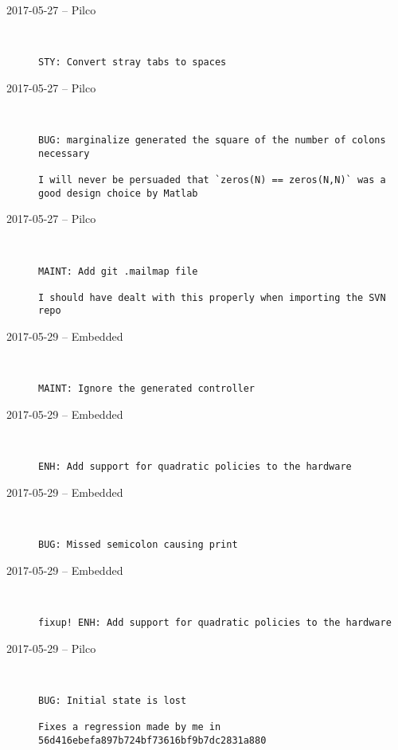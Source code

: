\begin{description}
  \item[2017-05-27 -- Pilco] \hfill \
\begin{lstlisting}
STY: Convert stray tabs to spaces
\end{lstlisting}


  \item[2017-05-27 -- Pilco] \hfill \
\begin{lstlisting}
BUG: marginalize generated the square of the number of colons necessary

I will never be persuaded that `zeros(N) == zeros(N,N)` was a good design choice by Matlab
\end{lstlisting}


  \item[2017-05-27 -- Pilco] \hfill \
\begin{lstlisting}
MAINT: Add git .mailmap file

I should have dealt with this properly when importing the SVN repo
\end{lstlisting}


  \item[2017-05-29 -- Embedded] \hfill \
\begin{lstlisting}
MAINT: Ignore the generated controller
\end{lstlisting}


  \item[2017-05-29 -- Embedded] \hfill \
\begin{lstlisting}
ENH: Add support for quadratic policies to the hardware
\end{lstlisting}


  \item[2017-05-29 -- Embedded] \hfill \
\begin{lstlisting}
BUG: Missed semicolon causing print
\end{lstlisting}


  \item[2017-05-29 -- Embedded] \hfill \
\begin{lstlisting}
fixup! ENH: Add support for quadratic policies to the hardware
\end{lstlisting}


  \item[2017-05-29 -- Pilco] \hfill \
\begin{lstlisting}
BUG: Initial state is lost

Fixes a regression made by me in 56d416ebefa897b724bf73616bf9b7dc2831a880
\end{lstlisting}



\end{description}
